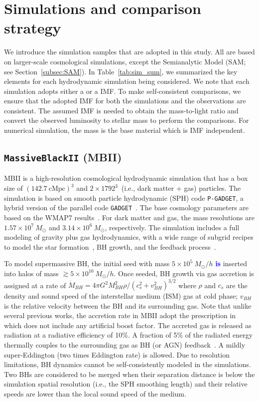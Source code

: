 \documentclass[twocolumn]{aastex631}
\newcommand{\blue}[1]{\textcolor{blue}{\bf #1}}
\begin{document}
\section{Simulations and comparison strategy}
\label{sec:simulations}
We introduce the simulation samples that are adopted in this study. All are based on larger-scale cosmological simulations, except the Semianalytic Model (SAM; see Section~\ref{subsec:SAM}). In Table~\ref{tab:sim_sum}, we summarized the key elements for each hydrodynamic simulation being considered. We note that each simulation adopts either a  \cite{2003PASP..115..763C} or a \cite{1955ApJ...121..161S} IMF. To make self-consistent comparisons, we ensure that the adopted IMF for both the simulations and the observations are consistent. The assumed IMF is needed to obtain the mass-to-light ratio and convert the observed luminosity to stellar mass to perform the comparisons. For numerical simulation, the mass is the base material which is IMF independent.


\subsection{{\tt MassiveBlackII} (MBII)}\label{subsec:MBII}
MBII is a high-resolution cosmological hydrodynamic simulation that has a box size of $(142.7~\mathrm{cMpc})^3$
and $2\times1792^3$~(i.e., dark matter + gas) particles. 
The simulation is based on smooth particle hydrodynamic (SPH) code \texttt{P-GADGET}, a hybrid version of the parallel code {\tt GADGET}~\citep{2005MNRAS.364.1105S}. The base cosmology parameters are based on the WMAP7 results~\citep{2011ApJS..192...18K}. For dark matter and gas, the mass resolutions are $1.57\times 10^7~M_{\odot}$ and $3.14\times 10^6~M_{\odot}$, respectively. The simulation includes a full modeling of gravity plus gas hydrodynamics, with a wide range of subgrid recipes to model the star formation~\citep{2003MNRAS.339..289S}, BH growth, and the feedback process~\citep{2005Natur.433..604D}. 

To model supermassive BH, the initial seed with mass $5\times 10^{5}~M_{\odot}/h$ \blue{is} inserted into halos of mass $\gtrsim 5\times 10^{10}~M_{\odot}/h$. Once seeded, BH growth via gas accretion is assigned at a rate of $\dot{M}_{BH}={4\pi G^2 M_{BH}^2 \rho}/{(c_s^2+v_{BH}^2)^{3/2}}$ where $\rho$ and $c_s$ are the density and sound speed of the interstellar medium (ISM) gas at cold phase; $v_{BH}$ is the relative velocity between the BH and its surrounding gas. Note that unlike several previous works, the accretion rate in MBII adopt the prescription in~\citet{Pelupessy2007} which does not include any artificial boost factor. The accreted gas is released as radiation at a radiative efficiency of 10\%. A fraction of 5\% of the radiated energy thermally couples to the surrounding gas as BH (or AGN) feedback~\citep{2005Natur.433..604D}. A mildly super-Eddington (two times Eddington rate) is allowed. Due to resolution limitations, BH dynamics cannot be self-consistently modeled in the simulations. Two BHs are considered to be merged when their separation distance is below the simulation spatial resolution (i.e., the SPH smoothing length) and their relative speeds are lower than the local sound speed of the medium.
\end{document}
